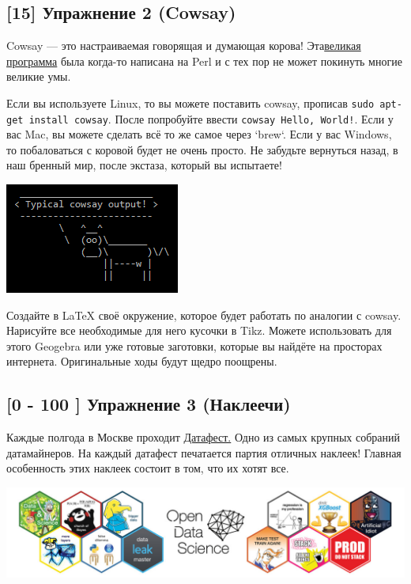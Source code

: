 \documentclass[12pt, a4paper, oneside]{article}
\begin{document}
\subsection*{[15]  Упражнение 2  (Cowsay)}

Cowsay — это настраиваемая говорящая и думающая корова! Эта\href{http://citkit.ru/articles/679/}{великая программа} была когда-то написана на Perl и с тех пор не может покинуть многие великие умы.

Если вы используете Linux, то вы можете поставить cowsay, прописав \texttt{sudo apt-get install cowsay}. После попробуйте ввести \texttt{cowsay Hello, World!}. Если у вас Mac, вы можете сделать всё то же самое через `brew`. Если у вас Windows, то побаловаться с коровой будет не очень просто. Не забудьте вернуться назад, в наш бренный мир, после экстаза, который вы испытаете!

\begin{center}
\includegraphics[scale=1]{Cowsay_Typical_Output.png}
\end{center}

Создайте в LaTeX своё окружение, которое будет работать по аналогии с cowsay. Нарисуйте все необходимые для него кусочки в Tikz. Можете использовать для этого Geogebra или уже готовые заготовки, которые вы найдёте на просторах интернета. Оригинальные ходы будут щедро поощрены.





\subsection*{[0 - 100 ]  Упражнение 3  (Наклеечи)}

Каждые полгода в Москве проходит \href{http://datafest.ru/}{Датафест.} Одно из самых крупных собраний датамайнеров. На каждый датафест печатается партия отличных наклеек! Главная особенность этих наклеек состоит в том, что их хотят все.

\begin{center}
	\includegraphics[scale=0.35]{DF.jpg}
\end{center}
\end{document}
